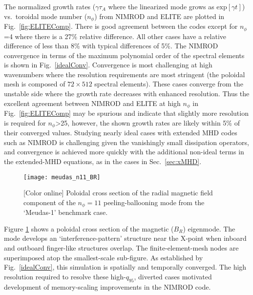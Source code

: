 The normalized growth rates ($\gamma \tau_A$ where the linearized mode grows as
$\text{exp}[\gamma t]$) vs.~toroidal mode number ($n_\phi$) from NIMROD and ELITE are
plotted in Fig.~\ref{fig:ELITEComp}.  There is good agreement between the
codes except for $n_\phi$=4 where there is a 27\% relative difference. All
other cases have a relative difference of less than 8\% with typical
differences of 5\%. The NIMROD convergence in terms of the maximum polynomial
order of the spectral elements is shown in Fig.~\ref{idealConv}. Convergence is
most challenging at high wavenumbers where the resolution requirements are most
stringent (the poloidal mesh is composed of $72\times512$ spectral elements).
These cases converge from the unstable side where the growth rate decreases with
enhanced resolution. Thus the excellent agreement between NIMROD and ELITE at
high $n_\phi$ in Fig.~\ref{fig:ELITEComp} may be spurious and indicate that
slightly more resolution is required for $n_\phi$>25, however, the 
shown growth rates are likely within 5\% of their converged values.
Studying nearly ideal cases with extended MHD codes such as NIMROD is challenging 
given the vanishingly small dissipation operators, and convergence is achieved
more quickly with the additional non-ideal terms in the extended-MHD equations,
as in the cases in Sec.~\ref{sec:xMHD}.


\begin{figure}
  \texttt{[image: meudas\_n11\_BR]}
  \caption{[Color online]
  Poloidal cross section of the radial magnetic field component of the
  $n_\phi=11$ peeling-ballooning mode from the `Meudas-1' benchmark case. }
  \vspace{-4mm}
  \label{meudas_n11_BR}
\end{figure}

Figure \ref{meudas_n11_BR} shows a poloidal cross section of the magnetic
($B_R$) eigenmode.  The mode develops an `interference-pattern' structure near
the X-point when inboard and outboard finger-like structures overlap. The
finite-element-mesh nodes are superimposed atop the smallest-scale sub-figure.
As established by Fig.~\ref{idealConv}, this simulation is spatially
and temporally converged. The high resolution required to resolve these
high-$q_{95}$, diverted cases
motivated development of memory-scaling improvements in the NIMROD code.
